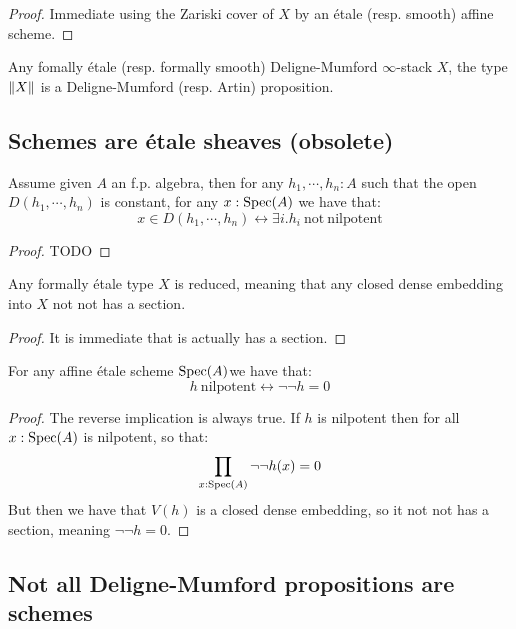 \begin{proof}
Immediate using the Zariski cover of $X$ by an étale (resp. smooth) affine scheme.
\end{proof}

\begin{lemma}
Any fomally étale (resp. formally smooth) Deligne-Mumford $\infty$-stack $X$, the type $\lVert X \rVert$ is a Deligne-Mumford (resp. Artin) proposition.
\end{lemma}

\subsection{Schemes are étale sheaves (obsolete)}

\begin{lemma}\label{constant-open-affine}
Assume given $A$ an f.p. algebra, then for any $h_1,\cdots,h_n:A$ such that the open $D(h_1,\cdots,h_n)$ is constant, for any $x:\operatorname{Spec}(A)$ we have that:
\[x\in D(h_1,\cdots,h_n) \leftrightarrow \exists i. h_i\ \mathrm{not\ nilpotent}\]
\end{lemma}

\begin{proof}
TODO
\end{proof}

\begin{lemma}
Any formally étale type $X$ is reduced, meaning that any closed dense embedding into $X$ not not has a section.
\end{lemma}

\begin{proof}
It is immediate that is actually has a section.
\end{proof}

\begin{corollary}\label{etale-affine-reduced}
For any affine étale scheme $\operatorname{Spec}(A)$we have that:
\[h\ \mathrm{nilpotent} \leftrightarrow \neg\neg h=0\]
\end{corollary}

\begin{proof}
The reverse implication is always true. If $h$ is nilpotent then for all $x:\operatorname{Spec}(A)$ is nilpotent, so that:
\[\prod_{x:\operatorname{Spec}(A)} \neg\neg h(x)=0\]
But then we have that $V(h)$ is a closed dense embedding, so it not not has a section, meaning $\neg\neg h = 0$.
\end{proof}

\subsection{Not all Deligne-Mumford propositions are schemes}

